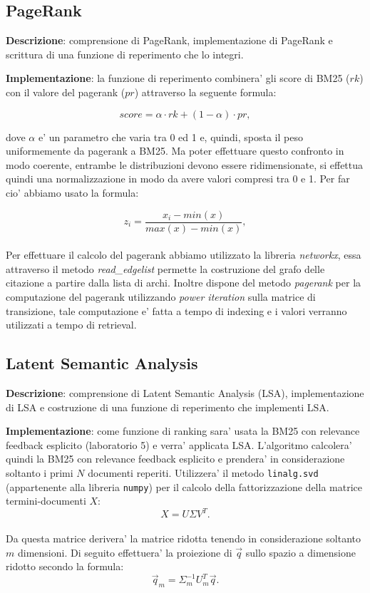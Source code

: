 \subsection{PageRank}
\label{sec:pagerank}

\textbf{Descrizione}: comprensione di PageRank, implementazione di PageRank e scrittura di una funzione di reperimento che lo integri.

\textbf{Implementazione}: la funzione di reperimento combinera' gli score di BM25 ($rk$) con il valore del pagerank ($pr$) attraverso la seguente formula:

\[ score =  \alpha \cdot rk + (1-\alpha) \cdot pr,\]

dove $\alpha$ e' un parametro che varia tra 0 ed 1 e, quindi, sposta il peso uniformemente da pagerank a BM25.
Ma poter effettuare questo confronto in modo coerente, entrambe le distribuzioni devono essere ridimensionate, si effettua quindi una normalizzazione in modo da avere valori compresi tra 0 e 1. Per far cio' abbiamo usato la formula:

\[ z_i = \frac{x_i - min(x)}{max(x) - min(x)}, \]
\\
Per effettuare il calcolo del pagerank abbiamo utilizzato la libreria \textit{networkx}, essa attraverso il metodo \textit{read\_edgelist} permette la costruzione del grafo delle citazione a partire dalla lista 	di archi. Inoltre dispone del metodo \textit{pagerank} per la computazione del pagerank utilizzando \textit{power iteration} sulla matrice di transizione, tale computazione e' fatta a tempo di indexing e i valori verranno utilizzati a tempo di retrieval.

\subsection{Latent Semantic Analysis}
\label{sec:lsa}

\textbf{Descrizione}: comprensione di Latent Semantic Analysis (LSA), implementazione di LSA e costruzione di una funzione di reperimento che implementi LSA.

\textbf{Implementazione}: come funzione di ranking sara' usata la BM25 con relevance feedback esplicito (laboratorio 5) e verra' applicata LSA. 
L'algoritmo calcolera' quindi la BM25 con relevance feedback esplicito e prendera' in considerazione soltanto i primi $N$ documenti reperiti. Utilizzera' il metodo \texttt{linalg.svd} (appartenente alla libreria \texttt{numpy}) per il calcolo della fattorizzazione della matrice termini-documenti $X$: 
\[ X = U \Sigma V^{T}. \]\\
Da questa matrice derivera' la matrice ridotta tenendo in considerazione soltanto $m$ dimensioni. Di seguito effettuera' la proiezione di $\vec{q}$ sullo spazio a dimensione ridotto secondo la formula: 
\[ \vec{q}_m = \Sigma^{-1}_m U^{T}_m \vec{q}. \]

